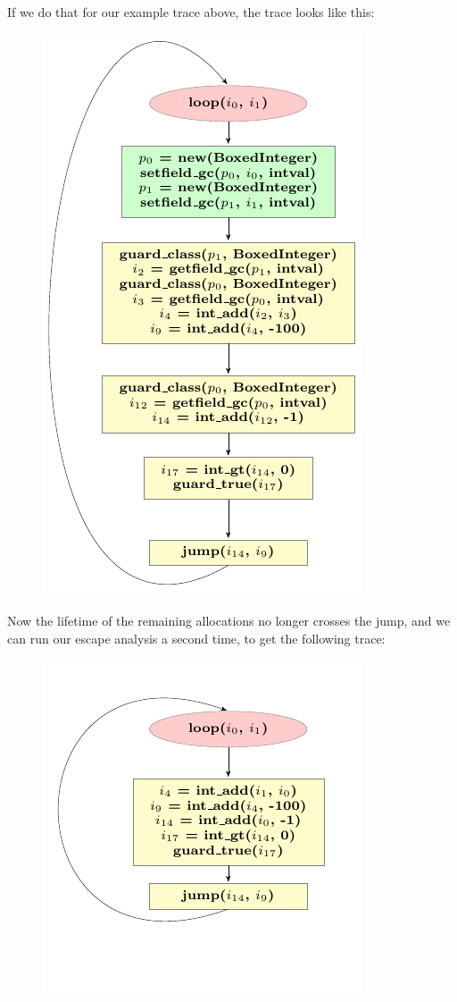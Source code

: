 \documentclass{sigplanconf}
\begin{document}
If we do that for our example trace above, the trace looks like this:
\begin{figure}
\includegraphics{figures/step2.pdf}
\end{figure}

Now the lifetime of the remaining allocations no longer crosses the jump, and
we can run our escape analysis a second time, to get the following trace:
\begin{figure}
\includegraphics{figures/step3.pdf}
\end{figure}
\end{document}
